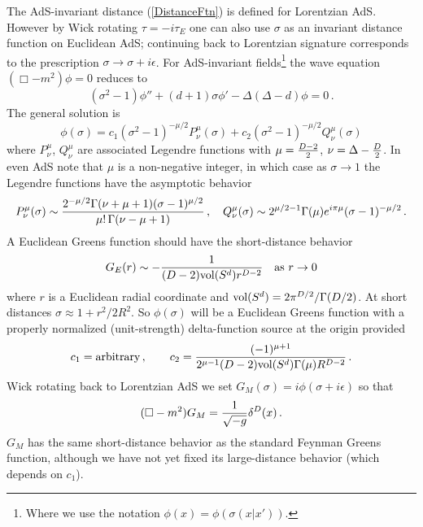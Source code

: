 \documentclass[12pt]{article}
\newcommand{\be}{\begin{equation}}
\newcommand{\ee}{\end{equation}}
\begin{document}
The AdS-invariant distance (\ref{DistanceFtn}) is defined for
Lorentzian AdS.  However by Wick rotating $\tau = - i \tau_E$ one can
also use $\sigma$ as an invariant distance function on Euclidean AdS;
continuing back to Lorentzian signature corresponds to the
prescription $\sigma \rightarrow \sigma + i \epsilon$.  For
AdS-invariant fields\footnote{Where we use the notation $\phi(x) =
\phi(\sigma(x \vert x'))$.} the wave equation $(\Box - m^2)\phi = 0$
reduces to
%
\be
\label{WaveEqn}
(\sigma^2 - 1) \phi'' + (d+1) \sigma \phi' - \Delta (\Delta - d) \phi = 0\,.
\ee
The general solution is
\be
\phi(\sigma) = c_1 (\sigma^2 - 1)^{-\mu/2} P_\nu^\mu(\sigma) + c_2 (\sigma^2 - 1)^{-\mu/2} Q_\nu^\mu(\sigma)
\ee
where $P^\mu_\nu$, $Q^\mu_\nu$ are associated Legendre functions with
$\mu = {D - 2 \over 2}$, $\nu = \Delta - {D \over 2}$.  In even AdS
note that $\mu$ is a non-negative integer, in which case as $\sigma
\rightarrow 1$ the Legendre functions have the asymptotic behavior
\cite{Bateman}
\begin{equation}
P^\mu_\nu(\sigma) \sim {2^{-\mu/2} \Gamma(\nu + \mu + 1) (\sigma - 1)^{\mu/2} \over \mu! \, \Gamma(\nu - \mu + 1)}\, , \quad
Q^\mu_\nu(\sigma) \sim 2^{\mu/2 - 1} \Gamma(\mu)  e^{i \pi \mu} (\sigma - 1)^{-\mu/2}\,.
\end{equation}
A Euclidean Greens function should have the short-distance behavior
\begin{equation}
\label{EuclideanShort}
G_E(r) \sim - {1 \over (D - 2) {\rm vol}(S^d) r^{D-2}} \quad \hbox{\rm as $r \rightarrow 0$}
\end{equation}
where $r$ is a Euclidean radial coordinate and ${\rm vol}(S^d) = 2
\pi^{D/2}/\Gamma(D/2)$.  At short distances $\sigma \approx 1 + r^2/2
R^2$.  So $\phi(\sigma)$ will be a Euclidean Greens function with a
properly normalized (unit-strength) delta-function source at the
origin provided
\be
c_1 = {\rm arbitrary}\, , \qquad c_2 = {(-1)^{\mu + 1} \over 2^{\mu - 1} (D-2) {\rm vol}(S^d) \Gamma(\mu) R^{D-2}}\,.
\ee
Wick rotating back to Lorentzian AdS we set $G_M(\sigma) = i \phi(\sigma + i \epsilon)$ so that
\begin{equation}
\label{MinkowskiGreens}
(\Box - m^2) G_M = {1 \over \sqrt{-g}} \delta^D(x)\,.
\end{equation}
$G_M$ has the same short-distance behavior as the standard Feynman
Greens function, although we have not yet fixed its large-distance
behavior (which depends on $c_1$).
\end{document}
